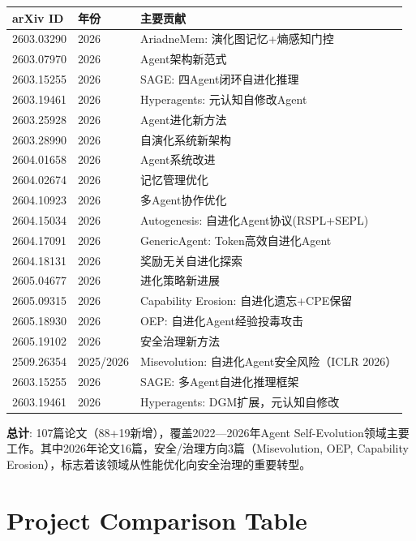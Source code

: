 \begin{longtable}{llp{7cm}}
\toprule
\textbf{arXiv ID} & \textbf{年份} & \textbf{主要贡献} \\
\midrule
2603.03290 & 2026 & AriadneMem: 演化图记忆+熵感知门控 \\
2603.07970 & 2026 & Agent架构新范式 \\
2603.15255 & 2026 & SAGE: 四Agent闭环自进化推理 \\
2603.19461 & 2026 & Hyperagents: 元认知自修改Agent \\
2603.25928 & 2026 & Agent进化新方法 \\
2603.28990 & 2026 & 自演化系统新架构 \\
2604.01658 & 2026 & Agent系统改进 \\
2604.02674 & 2026 & 记忆管理优化 \\
2604.10923 & 2026 & 多Agent协作优化 \\
2604.15034 & 2026 & Autogenesis: 自进化Agent协议(RSPL+SEPL) \\
2604.17091 & 2026 & GenericAgent: Token高效自进化Agent \\
2604.18131 & 2026 & 奖励无关自进化探索 \\
2605.04677 & 2026 & 进化策略新进展 \\
2605.09315 & 2026 & Capability Erosion: 自进化遗忘+CPE保留 \\
2605.18930 & 2026 & OEP: 自进化Agent经验投毒攻击 \\
2605.19102 & 2026 & 安全治理新方法 \\
2509.26354 & 2025/2026 & Misevolution: 自进化Agent安全风险（ICLR 2026） \\
2603.15255 & 2026 & SAGE: 多Agent自进化推理框架 \\
2603.19461 & 2026 & Hyperagents: DGM扩展，元认知自修改 \\
\bottomrule
\end{longtable}

\textbf{总计}: 107篇论文（88+19新增），覆盖2022—2026年Agent Self-Evolution领域主要工作。其中2026年论文16篇，安全/治理方向3篇（Misevolution, OEP, Capability Erosion），标志着该领域从性能优化向安全治理的重要转型。


\newpage
\section{Project Comparison Table}
\label{app:projects}

